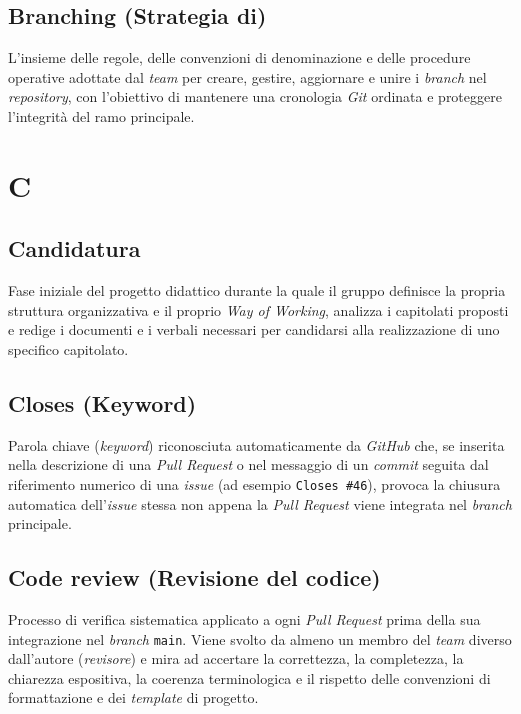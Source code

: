 \documentclass[11pt, a4paper]{article}
\begin{document}
\subsection*{Branching (Strategia di)}
L'insieme delle regole, delle convenzioni di denominazione e delle procedure operative adottate dal \textit{team} per creare, gestire, aggiornare e unire i \textit{branch} nel \textit{repository}, con l'obiettivo di mantenere una cronologia \textit{Git} ordinata e proteggere l'integrità del ramo principale.

\newpage

\section*{C}

\subsection*{Candidatura}
Fase iniziale del progetto didattico durante la quale il gruppo definisce la propria struttura organizzativa e il proprio \textit{Way of Working}, analizza i capitolati proposti e redige i documenti e i verbali necessari per candidarsi alla realizzazione di uno specifico capitolato.

\subsection*{Closes (Keyword)}
Parola chiave (\textit{keyword}) riconosciuta automaticamente da \textit{GitHub} che, se inserita nella descrizione di una \textit{Pull Request} o nel messaggio di un \textit{commit} seguita dal riferimento numerico di una \textit{issue} (ad esempio \texttt{Closes \#46}), provoca la chiusura automatica dell'\textit{issue} stessa non appena la \textit{Pull Request} viene integrata nel \textit{branch} principale.

\subsection*{Code review (Revisione del codice)}
Processo di verifica sistematica applicato a ogni \textit{Pull Request} prima della sua integrazione nel \textit{branch} \texttt{main}. Viene svolto da almeno un membro del \textit{team} diverso dall'autore (\textit{revisore}) e mira ad accertare la correttezza, la completezza, la chiarezza espositiva, la coerenza terminologica e il rispetto delle convenzioni di formattazione e dei \textit{template} di progetto.
\end{document}
